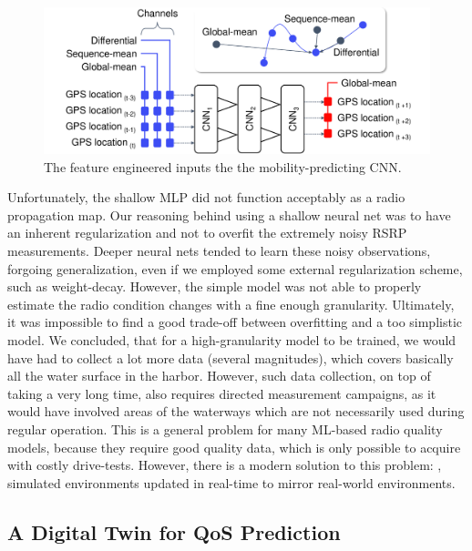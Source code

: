 			\begin{figure}[ht]
				\centering
				\includegraphics[width=0.85\columnwidth]{figures/10_pred_control/pred_control_cnn/cnn.pdf}
				\caption[Feature engineered inputs for the mobility-predicting CNN]{The feature engineered inputs the the mobility-predicting CNN.}
				\label{fig:pred_control_cnn}
			\end{figure}
			
			Unfortunately, the shallow \ac{MLP} did not function acceptably as a radio propagation map.
			Our reasoning behind using a shallow neural net was to have an inherent regularization and not to overfit the extremely noisy \ac{RSRP} measurements.
			Deeper neural nets tended to learn these noisy observations, forgoing generalization, even if we employed some external regularization scheme, such as weight-decay.
			However, the simple model was not able to properly estimate the radio condition changes with a fine enough granularity.
			Ultimately, it was impossible to find a good trade-off between overfitting and a too simplistic model.			
			We concluded, that for a high-granularity model to be trained, we would have had to collect a lot more data (several magnitudes), which covers basically all the water surface in the harbor.
			However, such data collection, on top of taking a very long time, also requires directed measurement campaigns, as it would have involved areas of the waterways which are not necessarily used during regular operation.			
			This is a general problem for many \ac{ML}-based radio quality models, because they require good quality data, which is only possible to acquire with costly drive-tests.
			However, there is a modern solution to this problem: , simulated environments updated in real-time to mirror real-world environments.

		\subsection{A Digital Twin for QoS Prediction}
		
